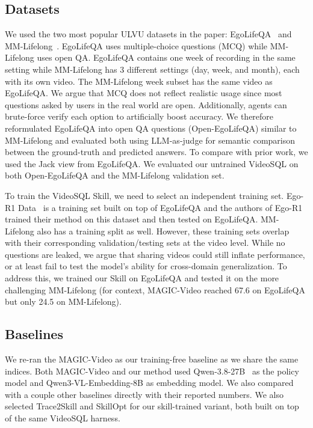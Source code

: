 \subsection{Datasets}
We used the two most popular ULVU datasets in the paper: EgoLifeQA~\cite{yang_egolife_2026} and MM-Lifelong~\cite{chen_multimodal_2026}. EgoLifeQA uses multiple-choice questions (MCQ) while MM-Lifelong uses open QA. EgoLifeQA contains one week of recording in the same setting while MM-Lifelong has 3 different settings (day, week, and month), each with its own video. The MM-Lifelong week subset has the same video as EgoLifeQA. We argue that MCQ does not reflect realistic usage since most questions asked by users in the real world are open. Additionally, agents can brute-force verify each option to artificially boost accuracy. We therefore reformulated EgoLifeQA into open QA questions (Open-EgoLifeQA) similar to MM-Lifelong and evaluated both using LLM-as-judge for semantic comparison between the ground-truth and predicted answers. To compare with prior work, we used the Jack view from EgoLifeQA. We evaluated our untrained VideoSQL on both Open-EgoLifeQA and the MM-Lifelong validation set. 

To train the VideoSQL Skill, we need to select an independent training set. Ego-R1 Data~\cite{tian_egor1_2025} is a training set built on top of EgoLifeQA and the authors of Ego-R1 trained their method on this dataset and then tested on EgoLifeQA. MM-Lifelong also has a training split as well. However, these training sets overlap with their corresponding validation/testing sets at the video level. While no questions are leaked, we argue that sharing videos could still inflate performance, or at least fail to test the model's ability for cross-domain generalization. To address this, we trained our Skill on EgoLifeQA and tested it on the more challenging MM-Lifelong (for context, MAGIC-Video reached 67.6 on EgoLifeQA but only 24.5 on MM-Lifelong). 


\subsection{Baselines}
We re-ran the MAGIC-Video \cite{li_bridging_2026} as our training-free baseline as we share the same indices. Both MAGIC-Video and our method used Qwen-3.8-27B~\cite{qwen38} as the policy model and Qwen3-VL-Embedding-8B \cite{li_qwen3vlembedding_2026} as embedding model. We also compared with a couple other baselines directly with their reported numbers. We also selected Trace2Skill \cite{ni_trace2skill_2026} and SkillOpt \cite{yang_skillopt_2026} for our skill-trained variant, both built on top of the same VideoSQL harness. 

